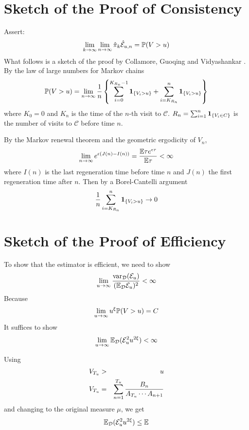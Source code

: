 \documentclass{beamer}
\begin{document}
\section{Sketch of the Proof of Consistency}
\begin{frame}
  Assert:
  \[
  \lim_{k \to \infty} \lim_{n \to \infty} \hat{\pi}_k \hat{\mathcal
    E}_{u,n} = \P(V > u)
  \]
  What follows is a sketch of the proof by Collamore, Guoqing and
  Vidyashankar \cite{collamore2014}. By the law of large numbers for
  Markov chains
  \[
  \P(V > u) = \lim_{n \to \infty} {1 \over n} \left\{
  \sum_{i=0}^{K_{R_n} - 1} \1{V_i > u}
  +
  \sum_{i=K_{R_n}}^{n} \1{V_i > u}
  \right\}
  \]
  where $K_0 = 0$ and $K_n$ is the time of the $n$-th visit to
  $\mathcal C$. $R_n = \sum_{i=1}^n \1{V_i \in C}$ is the number of
  visits to $\mathcal C$ before time $n$.
\end{frame}

\begin{frame}
  By the Markov renewal theorem and the geometric ergodicity of $V_n$,
  \[
  \lim_{n \to \infty} e^{\epsilon(J(n) - I(n))} = {
    \E \tau e^{\epsilon \tau}
    \over
    \E \tau
  }  < \infty
  \]
  where $I(n)$ is the last regeneration time before time $n$ and
  $J(n)$ the first regeneration time after $n$. Then by a
  Borel-Cantelli argument
  \[
  {1 \over n}\sum_{i=K_{R_n}}^n \1{V_i > u} \to 0
  \]
\end{frame}

\section{Sketch of the Proof of Efficiency}
\begin{frame}
  To show that the estimator is efficient, we need to show
  \[
  \lim_{u \to \infty} {
    \var_{\mathcal D}(\mathcal E_u)
    \over
    (\E_{\mathcal D} \mathcal E_u)^2
  } < \infty
  \]
  Because
  \[
  \lim_{u \to \infty} u^\xi \P(V > u) = C
  \]
  It suffices to show
  \[
  \lim_{u \to \infty}
    \E_{\mathcal D}(\mathcal E_u^2 u^{2\xi}) < \infty
  \]
\end{frame}

\begin{frame}
  Using
  \begin{eqnarray*}
    V_{T_u} &>& u \\
    V_{T_u} &=& \sum_{n=1}^{T_u} {B_n
      \over
      A_{T_u} \cdots A_{n+1}
    }
  \end{eqnarray*}
  and changing to the original measure $\mu$, we get
  \[
  \E_{\mathcal D}(\mathcal E_u^2 u^{2\xi}) \leq
  \E 
  \]
\end{frame}



\end{document}
